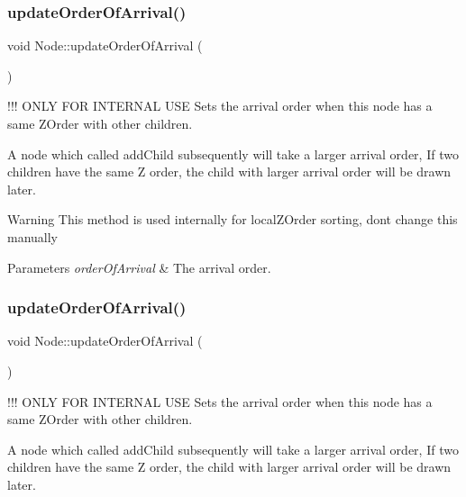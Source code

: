 \subsubsection{\texorpdfstring{update\+Order\+Of\+Arrival()}{updateOrderOfArrival()}\hspace{0.1cm}{\footnotesize\ttfamily [1/2]}}
{\footnotesize\ttfamily void Node\+::update\+Order\+Of\+Arrival (\begin{DoxyParamCaption}{ }\end{DoxyParamCaption})}

!!! O\+N\+LY F\+OR I\+N\+T\+E\+R\+N\+AL U\+SE Sets the arrival order when this node has a same Z\+Order with other children.

A node which called add\+Child subsequently will take a larger arrival order, If two children have the same Z order, the child with larger arrival order will be drawn later.

\begin{DoxyWarning}{Warning}
This method is used internally for local\+Z\+Order sorting, don\textquotesingle{}t change this manually
\end{DoxyWarning}

\begin{DoxyParams}{Parameters}
{\em order\+Of\+Arrival} & The arrival order. \\
\hline
\end{DoxyParams}
\mbox{\label{classNode_a75318d1418261ae7e8856ba2868b5a81}} 
\subsubsection{\texorpdfstring{update\+Order\+Of\+Arrival()}{updateOrderOfArrival()}\hspace{0.1cm}{\footnotesize\ttfamily [2/2]}}
{\footnotesize\ttfamily void Node\+::update\+Order\+Of\+Arrival (\begin{DoxyParamCaption}{ }\end{DoxyParamCaption})}

!!! O\+N\+LY F\+OR I\+N\+T\+E\+R\+N\+AL U\+SE Sets the arrival order when this node has a same Z\+Order with other children.

A node which called add\+Child subsequently will take a larger arrival order, If two children have the same Z order, the child with larger arrival order will be drawn later.

